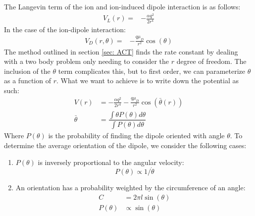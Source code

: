 The Langevin term of the ion and ion-induced dipole interaction is as follows:
\begin{align}
	V_L(r)= &-\frac{\alpha q^2}{2r^4}
\end{align}
In the case of the ion-dipole interaction:
\begin{align}
	V_D(r, \theta) = & -\frac{q\mu_D}{r^2} \cos(\theta)
\end{align}
The method outlined in section \ref{sec: ACT} finds the rate constant by dealing with a two body problem only needing to consider the $r$ degree of freedom. The inclusion of the $\theta$ term complicates this, but to first order, we can parameterize $\theta$ as a function of $r$. What we want to achieve is to write down the potential as such:
\begin{align}
    V(r) & = -\frac{\alpha q^2}{2r^4} - \frac{q\mu_D}{r^2} \cos\left(\bar{\theta}(r)\right) \nonumber \\
    \bar{\theta} & = \dfrac{\int \theta P(\theta) d\theta}{\int P(\theta) d\theta} \label{eq: avg theta}
\end{align}
Where $P(\theta)$ is the probability of finding the dipole oriented with angle $\theta$. To determine the average orientation of the dipole, we consider the following cases:
\begin{enumerate}
	\item $P(\theta)$ is inversely proportional to the angular velocity:
	\begin{equation*}
		P(\theta) \propto 1/\dot{\theta}
	\end{equation*}
	\item An orientation has a probability weighted by the circumference of an angle:
	\begin{align*}
		C & = 2\pi l \sin(\theta) \\
		P(\theta) & \propto \sin(\theta)
	\end{align*}
\end{enumerate}

